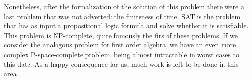 Nonetheless, after the formalization of the solution of this problem there were a last problem that was not adverted: the finiteness of time. SAT is the problem that has as input a propositional logic formula and solve whether it is satisfiable. This problem is NP-complete, quite famously the firs of these problems\cite{cook1971complexity}. If we consider the analogous problem for first order algebra, we have an even more complex P-space-complete problem, being almost intractable in worst cases to this date. As a happy consequence for us, much work is left to be done in this area \cite{cook2006p}. 

